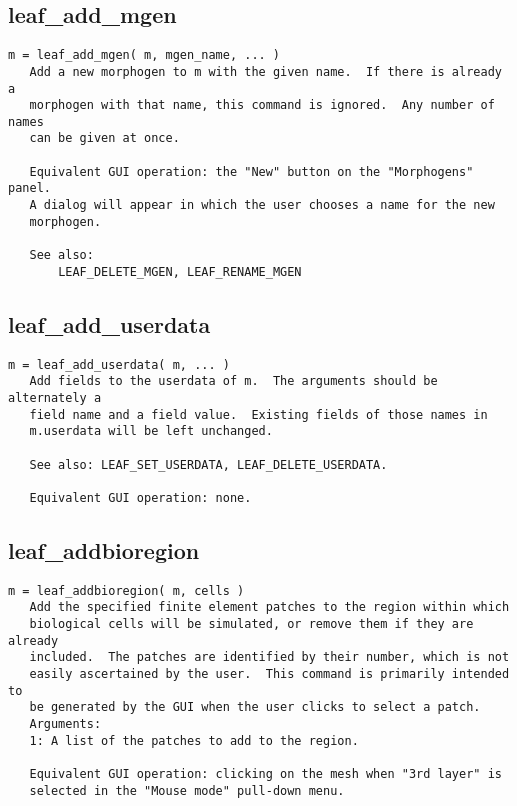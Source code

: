 \subsection{leaf\_add\_mgen}\label{section-leaf-add-mgen}

\begin{verbatim}
m = leaf_add_mgen( m, mgen_name, ... )
   Add a new morphogen to m with the given name.  If there is already a
   morphogen with that name, this command is ignored.  Any number of names
   can be given at once.

   Equivalent GUI operation: the "New" button on the "Morphogens" panel.
   A dialog will appear in which the user chooses a name for the new
   morphogen.

   See also:
       LEAF_DELETE_MGEN, LEAF_RENAME_MGEN
\end{verbatim}

\subsection{leaf\_add\_userdata}\label{section-leaf-add-userdata}

\begin{verbatim}
m = leaf_add_userdata( m, ... )
   Add fields to the userdata of m.  The arguments should be alternately a
   field name and a field value.  Existing fields of those names in
   m.userdata will be left unchanged.

   See also: LEAF_SET_USERDATA, LEAF_DELETE_USERDATA.

   Equivalent GUI operation: none.
\end{verbatim}

\subsection{leaf\_addbioregion}\label{section-leaf-addbioregion}

\begin{verbatim}
m = leaf_addbioregion( m, cells )
   Add the specified finite element patches to the region within which
   biological cells will be simulated, or remove them if they are already
   included.  The patches are identified by their number, which is not
   easily ascertained by the user.  This command is primarily intended to
   be generated by the GUI when the user clicks to select a patch.
   Arguments:
   1: A list of the patches to add to the region.

   Equivalent GUI operation: clicking on the mesh when "3rd layer" is
   selected in the "Mouse mode" pull-down menu.
\end{verbatim}

